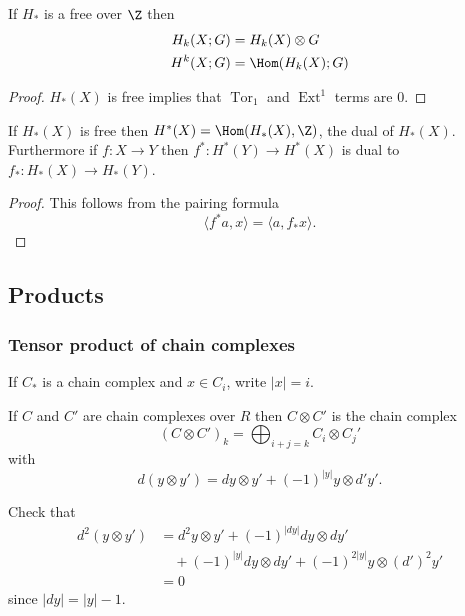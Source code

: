 \documentclass[a4paper]{article}
\DeclareMathOperator{\Tor}{Tor} %
\DeclareMathOperator{\Ext}{Ext} %
\begin{document}
\begin{corollary}
  If \(H_*\) is a free over \(\Z\) then
  \begin{align*}
    H_k(X; G) &= H_k(X) \otimes G \\
    H^k(X; G) &= \Hom(H_k(X); G)
  \end{align*}
\end{corollary}

\begin{proof}
  \(H_*(X)\) is free implies that \(\Tor_1\) and \(\Ext^1\) terms are \(0\).
\end{proof}

\begin{corollary}
  If \(H_*(X)\) is free then \(H^*(X) = \Hom(H_*(X), \Z)\), the dual of \(H_*(X)\). Furthermore if \(f: X \to Y\) then \(f^*: H^*(Y) \to H^*(X)\) is dual to \(f_*: H_*(X) \to H_*(Y)\).
\end{corollary}

\begin{proof}
  This follows from the pairing formula
  \[
    \langle f^*a, x \rangle = \langle a, f_* x\rangle.
  \]
\end{proof}

\subsection{Products}

\subsubsection{Tensor product of chain complexes}

\begin{notation}
  If \(C_*\) is a chain complex and \(x \in C_i\), write \(|x| = i\).
\end{notation}

\begin{definition}
  If \(C\) and \(C'\) are chain complexes over \(R\) then \(C \otimes C'\) is the chain complex
  \[
    (C \otimes C')_k = \bigoplus_{i + j = k} C_i \otimes C_j'
  \]
  with
  \[
    d(y \otimes y') = dy \otimes y' + (-1)^{|y|} y \otimes d'y'.
  \]
\end{definition}

Check that
\begin{align*}
  d^2(y \otimes y')
  &= d^2 y \otimes y' + (-1)^{|dy|} dy \otimes dy' \\
  &\quad + (-1)^{|y|} dy \otimes dy' + (-1)^{2|y|} y \otimes (d')^2 y' \\
  &= 0
\end{align*}
since \(|dy| = |y| - 1\).
\end{document}
